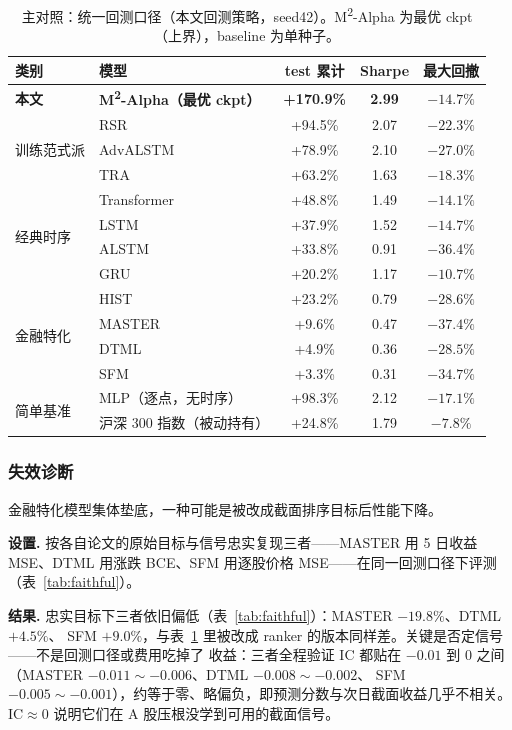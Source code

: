\documentclass[a4paper,11pt,fontset=fandol]{ctexart}
\newcommand{\msqa}{\texorpdfstring{M\textsuperscript{2}-Alpha}{M2-Alpha}} %
\begin{document}
\begin{table}[H]
\centering
\caption{主对照：统一回测口径（本文回测策略，seed42）。\msqa{} 为最优 ckpt（上界），baseline 为单种子。}
\label{tab:main}
\begin{tabular}{llccc}
\toprule
类别 & 模型 & test 累计 & Sharpe & 最大回撤 \\
\midrule
\textbf{本文} & \textbf{\msqa{}（最优 ckpt）} & \textbf{+170.9\%} & \textbf{2.99} & $-14.7\%$ \\
\midrule
\multirow{3}{*}{训练范式派}
 & RSR        & +94.5\% & 2.07 & $-22.3\%$ \\
 & AdvALSTM   & +78.9\% & 2.10 & $-27.0\%$ \\
 & TRA        & +63.2\% & 1.63 & $-18.3\%$ \\
\midrule
\multirow{4}{*}{经典时序}
 & Transformer & +48.8\% & 1.49 & $-14.1\%$ \\
 & LSTM        & +37.9\% & 1.52 & $-14.7\%$ \\
 & ALSTM       & +33.8\% & 0.91 & $-36.4\%$ \\
 & GRU         & +20.2\% & 1.17 & $-10.7\%$ \\
\midrule
\multirow{4}{*}{金融特化}
 & HIST   & +23.2\% & 0.79 & $-28.6\%$ \\
 & MASTER & +9.6\%  & 0.47 & $-37.4\%$ \\
 & DTML   & +4.9\%  & 0.36 & $-28.5\%$ \\
 & SFM    & +3.3\%  & 0.31 & $-34.7\%$ \\
\midrule
\multirow{2}{*}{简单基准}
 & MLP（逐点，无时序） & +98.3\% & 2.12 & $-17.1\%$ \\
 & 沪深 300 指数（被动持有） & +24.8\% & 1.79 & $-7.8\%$ \\
\bottomrule
\end{tabular}
\end{table}

\subsubsection{失效诊断}\label{sec:main-diag}
金融特化模型集体垫底，一种可能是被改成截面排序目标后性能下降。

\textbf{\heiti 设置.} 按各自论文的原始目标与信号忠实复现三者——MASTER 用 5 日收益 MSE、DTML 用涨跌 BCE、SFM
用逐股价格 MSE——在同一回测口径下评测（表~\ref{tab:faithful}）。

\textbf{\heiti 结果.} 忠实目标下三者依旧偏低（表~\ref{tab:faithful}）：MASTER $-19.8\%$、DTML $+4.5\%$、
SFM $+9.0\%$，与表~\ref{tab:main} 里被改成 ranker 的版本同样差。关键是否定信号——不是回测口径或费用吃掉了
收益：三者全程验证 IC 都贴在 $-0.01$ 到 $0$ 之间（MASTER $-0.011\sim-0.006$、DTML $-0.008\sim-0.002$、
SFM $-0.005\sim-0.001$），约等于零、略偏负，即预测分数与次日截面收益几乎不相关。IC$\approx 0$ 说明它们在
A 股压根没学到可用的截面信号。
\end{document}
